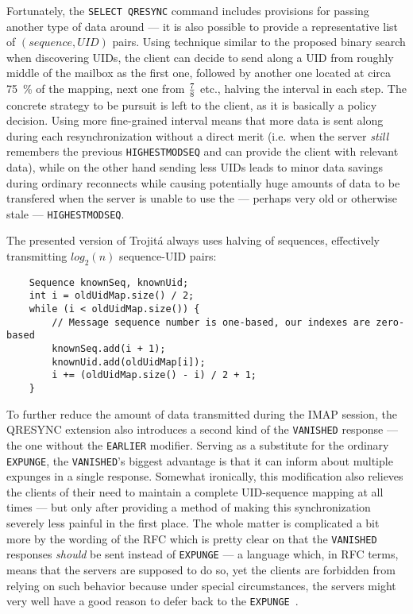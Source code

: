 \documentclass[trojita]{subfiles}
\begin{document}
Fortunately, the {\tt SELECT QRESYNC} command includes provisions for passing another type of data around --- it is also
possible to provide a representative list of $(sequence, UID)$ pairs.  Using technique similar to the proposed binary
search when discovering UIDs, the client can decide to send along a UID from roughly middle of the mailbox as the first
one, followed by another one located at circa 75~\% of the mapping, next one from $7 \over 8$ etc., halving the interval
in each step.  The concrete strategy to be pursuit is left to the client, as it is basically a policy decision.  Using
more fine-grained interval means that more data is sent along during each resynchronization without a direct merit (i.e.
when the server {\em still} remembers the previous {\tt HIGHESTMODSEQ} and can provide the client with relevant data),
while on the other hand sending less UIDs leads to minor data savings during ordinary reconnects while causing
potentially huge amounts of data to be transfered when the server is unable to use the --- perhaps very old or otherwise
stale --- {\tt HIGHESTMODSEQ}.

The presented version of Trojitá always uses halving of sequences, effectively transmitting $log_2(n)$ sequence-UID
pairs:

\begin{verbatim}
    Sequence knownSeq, knownUid;
    int i = oldUidMap.size() / 2;
    while (i < oldUidMap.size()) {
        // Message sequence number is one-based, our indexes are zero-based
        knownSeq.add(i + 1);
        knownUid.add(oldUidMap[i]);
        i += (oldUidMap.size() - i) / 2 + 1;
    }
\end{verbatim}


To further reduce the amount of data transmitted during the IMAP session, the QRESYNC extension also introduces a second
kind of the {\tt VANISHED} response --- the one without the {\tt EARLIER} modifier.  Serving as a substitute for the
ordinary {\tt EXPUNGE}, the {\tt VANISHED}'s biggest advantage is that it can inform about multiple expunges in a single
response.  Somewhat ironically, this modification also relieves the clients of their need to maintain a complete
UID-sequence mapping at all times --- but only after providing a method of making this synchronization severely less
painful in the first place.  The whole matter is complicated a bit more by the wording of the RFC which is pretty clear
on that the {\tt VANISHED} responses {\em should} be sent instead of {\tt EXPUNGE} --- a language which, in RFC terms,
means that the servers are supposed to do so, yet the clients are forbidden from relying on such behavior because under
special circumstances, the servers might very well have a good reason to defer back to the {\tt EXPUNGE}~\cite{rfc2119}.
\end{document}
